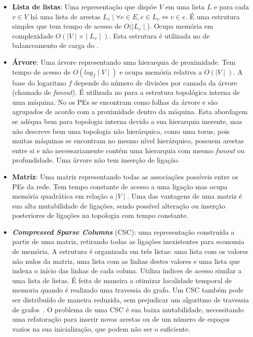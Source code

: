 \begin{itemize}
    \item \textbf{Lista de listas}: Uma representação que dispõe $V$ em uma lista $L$ e para cada $v \in V$ há uma lista de arestas $L_v \mid \forall e \in E, e \in L_v \iff v \in e$. 
    É uma estrutura simples que tem tempo de acesso de $O(\mid L_v \mid$).
    Ocupa memória em complexidade $O(\mid V \mid \times \mid L_v \mid)$.
    Esta estrutura é utilizada no \fw de balanceamento de carga do \charm.

    \item \textbf{Árvore}: Uma árvore representando uma hierarquia de proximidade. 
    Tem tempo de acesso de $O(log_f \mid V \mid)$ e ocupa memória relativa a $O(\mid V \mid)$.
    A base do logaritmo $f$ depende do número de divisões por camada da árvore (chamado de \textit{fanout}).
    É utilizada no \hwloc para a estrutura topológica interna de uma máquina. 
    No \hwloc os PEs se encontram como folhas da árvore e são agrupados de acordo com a proximidade dentro da máquina.
    Esta abordagem se adéqua bem para topologia interna devido a sua hierarquia inerente, mas não descreve bem uma topologia não hierárquica, como uma torus, pois muitas máquinas se encontram no mesmo nível hierárquico, possuem arestas entre si e não necessariamente contém uma hierarquia com mesmo \textit{fanout} ou profundidade.
    Uma árvore não tem inserção de ligação.
    
    \item \textbf{Matriz}: Uma matriz representando todas as associações possíveis entre os PEs da rede.
    Tem tempo constante de acesso a uma ligação mas ocupa memória quadrática em relação a $\mid V \mid$.
    Uma das vantagens de uma matriz é sua alta mutabilidade de ligações, sendo possível alteração ou inserção posteriores de ligações na topologia com tempo constante.

    \item \textbf{\textit{Compressed Sparse Columns}} (CSC): uma representação construída a partir de uma matriz, retirando todas as ligações inexistentes para economia de memória.
    A estrutura é organizada em três listas: uma lista com os valores não nulos da matriz, uma lista com as linhas destes valores e uma lista que indexa o início das linhas de cada coluna.
    Utiliza índices de acesso similar a uma lista de listas.
    É feita de maneira a otimizar localidade temporal de memoria quando é realizado uma travessia do grafo.
    Um CSC também pode ser distribuído de maneira reduzida, sem prejudicar um algoritmo de travessia de grafos~\cite{sun:csr}.
    O problema de uma CSC é sua baixa mutabilidade, necessitando uma refatoração para inserir novas arestas ou de um número de espaços vazios na sua inicialização, que podem não ser o suficiente.
\end{itemize}

